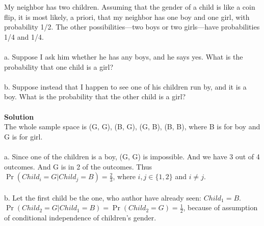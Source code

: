 My neighbor has two children. Assuming that the gender of a child is like a coin flip,
it is most likely, a priori, that my neighbor has one boy and one girl, with probability 1/2. The other
possibilities—two boys or two girls—have probabilities 1/4 and 1/4. \\ \\
a. Suppose I ask him whether he has any boys, and he says yes. What is the probability that one child is a
girl? \\ \\
b. Suppose instead that I happen to see one of his children run by, and it is a boy. What is the probability
that the other child is a girl?
\\ \\
\textbf{Solution} \\
The whole sample space is {(G, G), (B, G), (G, B), (B, B)}, where B is for boy and G is for girl.\\\\
a. Since one of the children is a boy, (G, G) is impossible. And we have 3 out of 4 outcomes. And G is in 2 of the outcomes. Thus\\ $\Pr(Child_i=G|Child_j=B) = \frac{2}{3}$, where $i, j \in \{1, 2\}$ and $i \neq j$.\\\\
b. Let the first child be the one, who author have already seen: $Child_1 = B$. $\Pr(Child_2=G|Child_1=B) = \Pr(Child_2=G) = \frac{1}{2}$, because of assumption of conditional independence of children's gender.